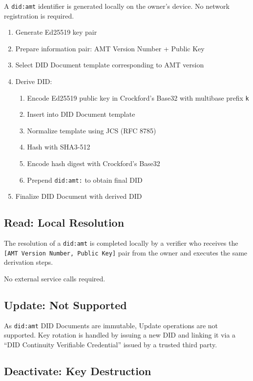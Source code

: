 A \texttt{did:amt} identifier is generated locally on the owner's device. No network registration is required.

\begin{enumerate}
  \item Generate Ed25519 key pair
  \item Prepare information pair: AMT Version Number + Public Key
  \item Select DID Document template corresponding to AMT version
  \item Derive DID:
    \begin{enumerate}
      \item Encode Ed25519 public key in Crockford's Base32 with multibase prefix \texttt{k}
      \item Insert into DID Document template
      \item Normalize template using JCS (RFC 8785)
      \item Hash with SHA3-512
      \item Encode hash digest with Crockford's Base32
      \item Prepend \texttt{did:amt:} to obtain final DID
    \end{enumerate}
  \item Finalize DID Document with derived DID
\end{enumerate}

\subsection{Read: Local Resolution}

The resolution of a \texttt{did:amt} is completed locally by a verifier who receives the \texttt{[AMT Version Number, Public Key]} pair from the owner and executes the same derivation steps.

No external service calls required.

\subsection{Update: Not Supported}

As \texttt{did:amt} DID Documents are immutable, Update operations are not supported. Key rotation is handled by issuing a new DID and linking it via a ``DID Continuity Verifiable Credential'' issued by a trusted third party.

\subsection{Deactivate: Key Destruction}

